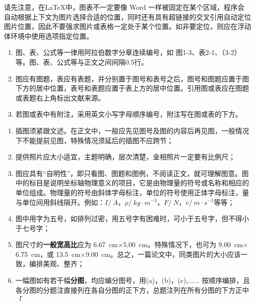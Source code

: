 

请先注意，在\LaTeX 中，图表不一定要像 Word 一样被固定在某个区域，程序会自动根据上下文为图片选择合适的位置，同时还有具有超链接的交叉引用自动定位图片位置，因此不要强求图片或表格一定处于某个位置。如非要定位，则应在浮动体环境中使用\clist{[H]}选项指定位置。

\begin{tcolorbox}[colback=red!5!white,colframe=red!75!black]
  \begin{enumerate}[leftmargin=0.5cm]
    \item 图、表、公式等一律用阿拉伯数字分章连续编号，如 图1-3、表2-1、（3-2）等。图、表、公式等与正文之间间隔0.5行。

    \item 图应有图题，表应有表题，并分别置于图号和表号之后，图号和图题应置于图下方的居中位置，表号和表题应置于表上方的居中位置。引用图或表应在图题或表题右上角标出文献来源。

    \item 若图或表中有附注，采用英文小写字母顺序编号，附注写在图或表的下方。
  \end{enumerate}
\end{tcolorbox}



\begin{tcolorbox}[colback=red!5!white,colframe=red!75!black]
  \begin{enumerate}[leftmargin=0.5cm]
    \item 插图须紧跟文述。在正文中，一般应先见图号及图的内容后再见图，一般情况下不能提前见图，特殊情况须延后的插图不应跨节；
    \item 提供照片应大小适宜，主题明确，层次清楚，金相照片一定要有比例尺；
    \item 图应具有“自明性”，即只看图、图题和图例，不阅读正文，就可理解图意。图中的标目是说明坐标轴物理意义的项目，它是由物理量的符号或名称和相应的单位组成。物理量的符号由斜体字母标注，单位的符号使用正体字母标注，量与单位间用斜线隔开。例如：$I/\SI{}{A}$，$\rho/\SI{}{kg\cdot m^{-3}}$，$F/\SI{}{N}$，$v/\SI{}{m\cdot s^{-1}}$等等；
    \item 图中用字为五号，如排列过密，用五号字有困难时，可小于五号字，但不得小于七号字；
    \item 图尺寸的\textbf{一般宽高比}应为 \SI{6.67}{cm}$\times$\SI{5.00}{cm}。特殊情况下，也可为 \SI{9.00}{cm}$\times$\SI{6.75}{cm}，或 \SI{13.5}{cm}$\times$\SI{9.00}{cm}。总之，一篇论文中，同类图片的大小应该一致，编排美观、整齐；
    \item 一幅图如有若干幅\textbf{分图}，均应编分图号，用(a)，(b)，(c),...... 按顺序编排，且各分图的分题注直接列在各自分图的正下方，总题注列在所有分图的下方正中「
  \end{enumerate}
\end{tcolorbox}

